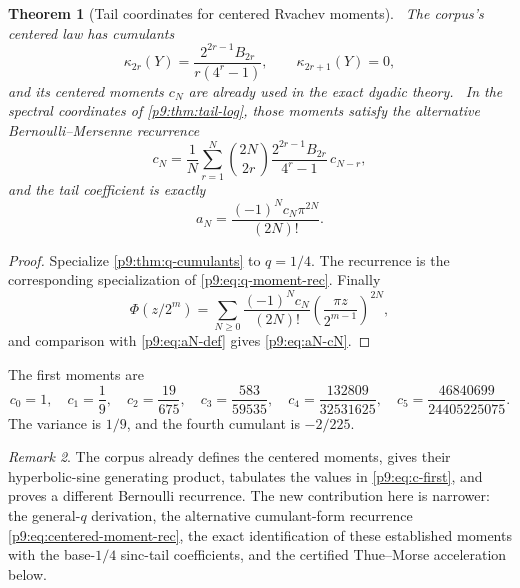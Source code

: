 \documentclass[11pt]{article}
\numberwithin{equation}{section}
\newtheorem{theorem}{Theorem}[section]
\theoremstyle{definition}
\theoremstyle{remark}
\newtheorem{remark}[theorem]{Remark}
\begin{document}
\begin{theorem}[Tail coordinates for centered Rvachev moments]\label{p9:thm:centered-cumulants}
\statusE\ The corpus's centered law has cumulants
\begin{equation}
 \boxed{
 \kappa_{2r}(Y)=\frac{2^{2r-1}B_{2r}}{r(4^r-1)},
 \qquad \kappa_{2r+1}(Y)=0,}                               \label{p9:eq:centered-cumulants}
\end{equation}
and its centered moments $c_N$ are already used in the exact dyadic theory.
\statusN\ In the spectral coordinates of \cref{p9:thm:tail-log}, those moments satisfy the
alternative Bernoulli--Mersenne recurrence
\begin{equation}
 \boxed{
 c_N=\frac1N\sum_{r=1}^{N}\binom{2N}{2r}
 \frac{2^{2r-1}B_{2r}}{4^r-1}\,c_{N-r},}                 \label{p9:eq:centered-moment-rec}
\end{equation}
and the tail coefficient is exactly
\begin{equation}
 \boxed{a_N=\frac{(-1)^Nc_N\pi^{2N}}{(2N)!}.}             \label{p9:eq:aN-cN}
\end{equation}
\end{theorem}

\begin{proof}
Specialize \cref{p9:thm:q-cumulants} to $q=1/4$.  The recurrence is the corresponding
specialization of \eqref{p9:eq:q-moment-rec}.  Finally
\[
 \Phi(z/2^m)=\sum_{N\ge0}\frac{(-1)^Nc_N}{(2N)!}
 \left(\frac{\pi z}{2^{m-1}}\right)^{2N},
\]
and comparison with \eqref{p9:eq:aN-def} gives \eqref{p9:eq:aN-cN}.
\end{proof}

The first moments are
\begin{equation}
 c_0=1,
 \quad c_1=\frac19,
 \quad c_2=\frac{19}{675},
 \quad c_3=\frac{583}{59535},
 \quad c_4=\frac{132809}{32531625},
 \quad c_5=\frac{46840699}{24405225075}.                   \label{p9:eq:c-first}
\end{equation}
The variance is $1/9$, and the fourth cumulant is $-2/225$.

\begin{remark}
The corpus already defines the centered moments, gives their hyperbolic-sine generating
product, tabulates the values in \eqref{p9:eq:c-first}, and proves a different Bernoulli
recurrence.  The new contribution here is narrower: the general-$q$ derivation, the
alternative cumulant-form recurrence \eqref{p9:eq:centered-moment-rec}, the exact identification
of these established moments with the base-$1/4$ sinc-tail coefficients, and the certified
Thue--Morse acceleration below.
\end{remark}
\end{document}
